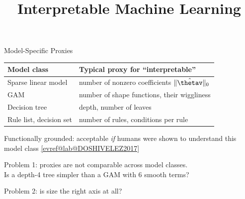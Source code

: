 \documentclass[10pt,compress,t,notes=noshow, xcolor=table]{beamer}
\title{Interpretable Machine Learning}
\makeatletter
\newcommand{\citeref}[1]{%
  \href{\csname evref@url@#1\endcsname}{[\csname evref@lab@#1\endcsname]}}
\makeatother
\begin{document}





\begin{framev}[align=mid]{Model-Specific Proxies}
\centering\small
\renewcommand{\arraystretch}{1.3}
\begin{tabular}{@{}ll@{}}
\toprule
Model class & Typical proxy for ``interpretable'' \\
\midrule
Sparse linear model & number of nonzero coefficients $\|\hat\thetav\|_0$ \\
GAM & number of shape functions, their wiggliness \\
Decision tree & depth, number of leaves \\
Rule list, decision set & number of rules, conditions per rule \\
\bottomrule
\end{tabular}
\spacer[0.8]
\raggedright
\begin{itemizeM}
\item Functionally grounded: acceptable \emph{if} humans were shown to understand this model class \citeref{DOSHIVELEZ2017}
\item Problem 1: proxies are not comparable across model classes.\\ Is a depth-4 tree simpler than a GAM with 6 smooth terms?
\item Problem 2: is size the right axis at all? 
\end{itemizeM}
\end{framev}
\end{document}
